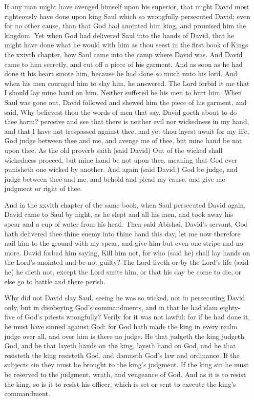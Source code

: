 If any man might have avenged himself upon his superior,
that might David most righteously have done upon
king Saul which so wrongfully persecuted David; even 
for no other cause, than that God had anointed him king, 
and promised him the kingdom. Yet when God had delivered
Saul into the hands of David, that he might have 
done what he would with him as thou seest in the first book 
of Kings the xxivth chapter, how Saul came into the camp 
where David was. And David came to him secretly, and 
cut off a piece of his garment. And as soon as he had 
done it his heart smote him, because he had done so much 
unto his lord. And when his men couraged him to slay 
him, he answered. The Lord forbid it me that I should 
lay mine hand on him. Neither suffered he his men to 
hurt him. When Saul was gone out, David followed and 
shewed him the piece of his garment, and said, Why believest
thou the words of men that say, David goeth about 
to do thee harm? perceive and see that there is neither 
evil nor wickedness in my hand, and that I have not trespassed
against thee, and yet thou layest await for my life, 
God judge between thee and me, and avenge me of thee, 
but mine hand be not upon thee. As the old proverb saith 
(said David) Out of the wicked shall wickedness proceed, 
but mine hand be not upon thee, meaning that God ever 
punisheth one wicked by another. And again (said David,) 
God be judge, and judge between thee and me, and 
behold and plead my cause, and give me judgment or right 
of thee. 

And in the xxvith chapter of the same book, when Saul 
persecuted David again, David came to Saul by night, 
as he slept and all his men, and took away his spear and a 
cup of water from his head. Then said Abishai, David's
servant, God hath delivered thee thine enemy into thine 
hand this day, let me now therefore nail him to the ground 
with my spear, and give him but even one stripe and no 
more. David forbad him saying, Kill him not, for who 
(said he) shall lay hands on the Lord's anointed and be 
not guilty? The Lord liveth or by the Lord's life (said he) 
he dieth not, except the Lord smite him, or that his day be 
come to die, or else go to battle and there perish.

Why did not David slay Saul, seeing he was so wicked,
not in persecuting David only, but in disobeying God's
commandments, and in that he had slain eighty-five of 
God's priests wrongfully? Verily for it was not lawful:
for if he had done it, he must have sinned against God:
for God hath made the king in every realm judge over 
all, and over him is there no judge. He that judgeth the 
king judgeth God, and he that layeth hands on the king, 
layeth hand on God, and he that resisteth the king resisteth
God, and damneth God's law and ordinance. If the 
subjects sin they must be brought to the king's judgment. 
If the king sin he must be reserved to the judgment, 
wrath, and vengeance of God. And as it is to resist the 
king, so is it to resist his officer, which is set or sent to 
execute the king's commandment. 

